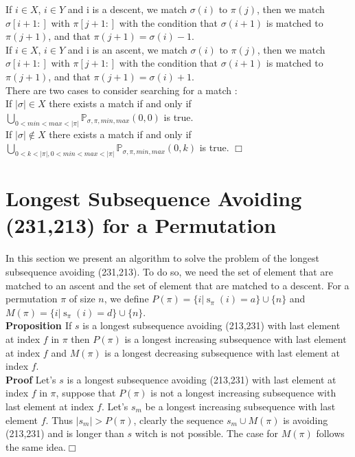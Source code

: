 \documentclass[a4paper]{llncs}
\newcommand{\ptext}{\pi}
\newcommand{\pmotif}{\sigma}
\newcommand{\x}{X}
\newcommand{\y}{Y}
\DeclareMathOperator{\stripea}{s}
\newcommand{\stripe}[2]{\stripea_{{#1}}({#2})}
\newcounter{num}
\newcommand{\numl}[1]{\refstepcounter{num}\label{#1}}
\newcommand{\dstep}{d}
\newcommand{\ustep}{a}
\begin{document}
			If $i \in \x$, $i \in \y$ and i is a descent,
			we match $\pmotif(i)$ to $\ptext(j)$, 
			then we match $\pmotif[i+1:]$ with $\ptext[j+1:]$
			with the condition that
			$\pmotif(i+1)$ is matched to $\ptext(j+1)$,
			and that $\ptext(j+1)=\pmotif(i)-1$.\\			

			If $i \in \x$, $i \in \y$ and i is an ascent,
			we match $\pmotif(i)$ to $\ptext(j)$, 
			then we match $\pmotif[i+1:]$ with $\ptext[j+1:]$
			with the condition that
			$\pmotif(i+1)$ is matched to $\ptext(j+1)$,
			and that $\ptext(j+1)=\pmotif(i)+1$.\\		
					
			There are two cases to consider searching for a match : \\
			If $|\pmotif| \in \x$ there exists a match
			if and only if\\ $\bigcup_{0<min<max<|\ptext|}\mathbb{P}_{\pmotif,\ptext,min,max}(0,0)$ is true.\\
			
			If $|\pmotif| \notin \x$ there exists a match if and only if \\	$\bigcup_{0<k<|\ptext|,0<min<max<|\ptext|}\mathbb{P}_{\pmotif,\ptext,min,max}(0,k)$
			is true. $\Box$  			
	
	\section{Longest Subsequence Avoiding \\(231,213) for a Permutation}

	In this section we present an algorithm to solve the problem
	of the longest subsequence avoiding (231,213).
	To do so, we need the set of element
	that are matched to an ascent and the
	set of element that are matched to a descent.
	For a permutation $\pi$ of size $n$, we define
	$P(\pi) = \{i | \stripe{\pi}{i} = \ustep \} \cup \{n\}$ and  
	$M(\pi) = \{i | \stripe{\pi}{i} = \dstep \} \cup \{n\}$.\\
	
	\textbf{Proposition  \numl{longestIncreasingSubsequence} \thenum}
	If $s$ is a longest subsequence avoiding (213,231) with last element at index $f$ in $\pi$ then
	$P(\pi)$ is a longest increasing subsequence with last element at index $f$ and
	$M(\pi)$ is a longest decreasing subsequence with last element at index $f$.\\

	
	\textbf{Proof} Let's $s$ is a longest subsequence avoiding (213,231) with last element at index $f$ in $\pi$, 
	suppose that $P(\pi)$ is not a longest increasing subsequence with last element at index $f$. Let's $s_m$ be a longest increasing subsequence with last element $f$.
	Thus $|s_m|>P(\pi)$, clearly the sequence $s_m \cup M(\pi)$
	is avoiding (213,231) and is longer than $s$ witch is not possible. 
	The case for $M(\pi)$ follows the same idea.$\Box$\\
\end{document}
